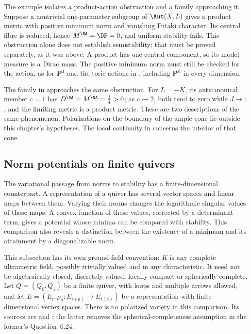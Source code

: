 \begin{remark}
\label{rem:ch50-separation-general}
The example isolates a product-action obstruction and a family approaching
it.  Suppose a nontrivial one-parameter subgroup of $\Aut(X,L)$ gives a
product metric with positive minimum norm and vanishing Futaki character.
Its central fibre is reduced, hence $M^{\NA}=\DF=0$, and uniform
stability fails.  This obstruction alone does not establish semistability;
that must be proved separately, as it was above.  A product has one
central component, so its model measure is a Dirac mass.  The positive
minimum norm must still be checked for the action, as for $\mathbf P^1$
and the toric actions in , including
$\mathbf P^n$ in every dimension.

The family in  approaches the same obstruction.
For $L=-K$, its anticanonical member $c=1$ has
$D^{\NA}=M^{\NA}=\tfrac14>0$; as $c\to2$, both tend to zero while
$J\to1$, and the limiting metric is a product metric.  These are two
descriptions of the same phenomenon.  Polarizations on the boundary of
the ample cone lie outside this chapter's hypotheses.  The local
continuity in  concerns the interior of that cone.
\end{remark}

\subsection{Norm potentials on finite quivers}
\label{subsec:ch50-harmonic-quiver}

The variational passage from norms to stability has a finite-dimensional
counterpart. A representation of a quiver has several vector spaces and
linear maps between them. Varying their norms changes the logarithmic
singular values of those maps. A convex function of these values, corrected
by a determinant term, gives a potential whose minima can be compared with
stability. This comparison also reveals a distinction between the existence
of a minimum and its attainment by a diagonalizable norm.

This subsection has its own ground-field convention: $K$ is any complete
ultrametric field, possibly trivially valued and in any characteristic.
It need not be algebraically closed, discretely valued, locally compact or
spherically complete. Let $Q=(Q_0,Q_1)$ be a finite quiver, with loops and
multiple arrows allowed, and let
$E=(E_i,\rho_a:E_{s(a)}\to E_{t(a)})$ be a representation with
finite-dimensional vertex spaces. There is no polarized variety in this
comparison. Its sources are \cite{HKKP26CategoricalV1} and
\cite{BB26HarmonicQuiverV1}; the latter removes the spherical-completeness
assumption in the former's Question~6.24.

